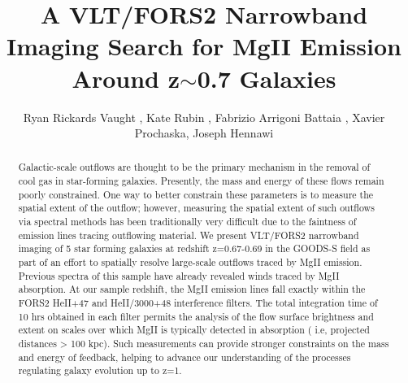 \documentclass[twocolumn]{aastex6}
\begin{document}
\title{A VLT/FORS2 Narrowband Imaging Search for MgII Emission Around z$\sim$0.7 Galaxies }
\author{Ryan Rickards Vaught , Kate Rubin , Fabrizio Arrigoni Battaia , Xavier Prochaska, Joseph Hennawi}


\begin{abstract}
Galactic-scale outflows are thought to be the primary mechanism in the removal of cool gas in star-forming galaxies. 
%
Presently, the mass and energy of these flows remain poorly constrained.
%
One way to better constrain these parameters is to measure the spatial extent of the outflow; however, measuring the spatial extent of such outflows via spectral methods has been traditionally very difficult due to the faintness of emission lines tracing outflowing material. 
%
We present VLT/FORS2 narrowband imaging of 5 star forming galaxies at redshift z=0.67-0.69 in the GOODS-S field as part of an effort to spatially resolve large-scale outflows traced by MgII emission. 
%
Previous spectra of this sample have already revealed winds traced by MgII absorption. 
%
At our sample redshift, the MgII emission lines fall exactly within the FORS2 HeII+47 and HeII/3000+48 interference filters.
%
The total integration time of 10 hrs obtained in each filter permits the analysis of the flow surface brightness and extent on scales over which MgII is typically detected in absorption ( i.e, projected distances > 100 kpc). 
%
Such measurements can provide stronger constraints on the mass and energy of feedback, helping to advance our understanding of the processes regulating galaxy evolution up to z=1. 
\end{abstract}

\maketitle
\end{document}
